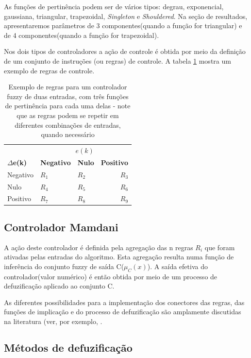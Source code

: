 \documentclass[
	twoside,				%
	twocolumn,				%
	english,				%
	brazil,					%
]{article}
\begin{document}
As funções de pertinência podem ser de vários tipos: degrau, exponencial, gaussiana, triangular, trapezoidal, \textit{Singleton} e \textit{Shouldered}. Na seção de resultados, apresentaremos parâmetros de 3 componentes(quando a função for triangular) e de 4 componentes(quando a função for trapezoidal).

Nos dois tipos de controladores a ação de controle é obtida por meio da definição de um conjunto de instruções (ou regras) de controle. A tabela \ref{table:fuzzyrules} mostra um exemplo de regras de controle.

\begin{table}[!ht]
\caption{Exemplo de regras para um controlador fuzzy de duas entradas,  com três funções de pertinência para cada uma delas - note que as regras podem se repetir em diferentes combinações de entradas, quando necessário}
\label{table:fuzzyrules}
\centering
\begin{tabular}{lllr}
\toprule
\multicolumn{3}{r}{\textbf{$e(k)$}} \\
\cmidrule(r){2-4}
\textbf{$\Delta$e(k)} & \textbf{Negativo} & \textbf{Nulo} & \textbf{Positivo} \\
Negativo & $R_1$ & $R_2$ & $R_3$ \\
Nulo & $R_4$ & $R_5$ & $R_6$ \\
Positivo & $R_7$ & $R_8$ & $R_9$ \\
\bottomrule
\end{tabular}
\end{table}


\subsection{Controlador Mamdani}

A ação deste controlador é definida pela agregação das n regras $R_i$ que foram ativadas pelas entradas do algoritmo. Esta agregação resulta numa função de inferência do conjunto fuzzy de saída C($\mu_C(x)$). A saída efetiva do controlador(valor numérico) é então obtida por meio de um processo de defuzificação aplicado ao conjunto C. 

As diferentes possibilidades para a implementação dos conectores das regras, das funções de implicação e do processo de defuzificação são amplamente discutidas na literatura (ver, por exemplo, \cite{Lee:1990}.

\subsection{Métodos de defuzificação}
\end{document}

